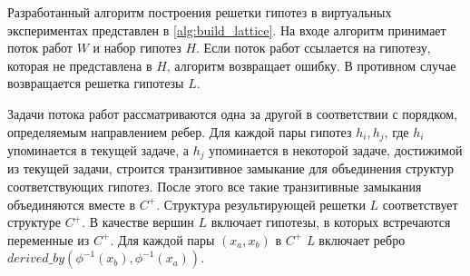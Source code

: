 Разработанный алгоритм построения решетки гипотез в виртуальных экспериментах представлен в 
\cref{alg:build_lattice}. На входе алгоритм принимает поток работ $W$ и набор гипотез $H$. 
Если поток работ ссылается на гипотезу, которая не представлена в $H$, алгоритм возвращает ошибку. 
В противном случае возвращается решетка гипотезы $L$.  

Задачи потока работ рассматриваются одна за другой в соответствии с порядком, определяемым направлением ребер. 
Для каждой пары гипотез $h_i, h_j$, где $h_i$ упоминается в текущей задаче, а $h_j$ упоминается в некоторой задаче, 
достижимой из текущей задачи, строится транзитивное замыкание для объединения структур соответствующих гипотез. 
После этого все такие транзитивные замыкания объединяются вместе в $C^+$. Структура результирующей решетки $L$ 
соответствует структуре $C^+$. В качестве вершин $L$ включает гипотезы, в которых встречаются переменные из $C^+$. 
Для каждой пары $\left(x_a, x_b\right)$ в $C^+$ \textit{L} включает ребро 
$derived\_by \left(\phi^{-1}\left(x_b\right), \phi^{-1}\left(x_a\right)\right)$.

